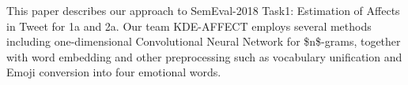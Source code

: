 This paper describes our approach to SemEval-2018 Task1: Estimation of Affects in Tweet for 1a and 2a. Our team KDE-AFFECT employs several methods including one-dimensional Convolutional Neural Network for \$n\$-grams, together with word embedding and other preprocessing such as vocabulary unification and Emoji conversion into four emotional words.
